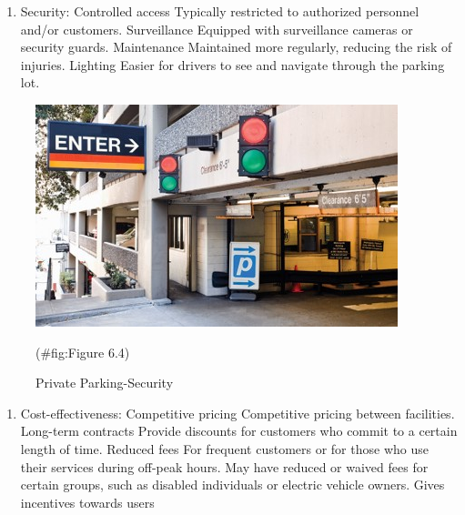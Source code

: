 \documentclass[
]{book}
\providecommand{\tightlist}{%
  \setlength{\itemsep}{0pt}\setlength{\parskip}{0pt}}
\begin{document}
\begin{enumerate}
\def\labelenumi{\arabic{enumi}.}
\setcounter{enumi}{2}
\tightlist
\item
  Security:
  Controlled access
  Typically restricted to authorized personnel and/or customers.
  Surveillance
  Equipped with surveillance cameras or security guards.
  Maintenance
  Maintained more regularly, reducing the risk of injuries.
  Lighting
  Easier for drivers to see and navigate through the parking lot.
\end{enumerate}

\begin{figure}

{\centering \includegraphics{./Images/Parking/Private Parking-Security} 

}

\caption{Private Parking-Security}(\#fig:Figure 6.4)
\end{figure}

\begin{enumerate}
\def\labelenumi{\arabic{enumi}.}
\setcounter{enumi}{3}
\tightlist
\item
  Cost-effectiveness:
  Competitive pricing
  Competitive pricing between facilities.
  Long-term contracts
  Provide discounts for customers who commit to a certain length of time.
  Reduced fees
  For frequent customers or for those who use their services during off-peak hours.
  May have reduced or waived fees for certain groups, such as disabled individuals or electric vehicle owners.
  Gives incentives towards users
\end{enumerate}
\end{document}
